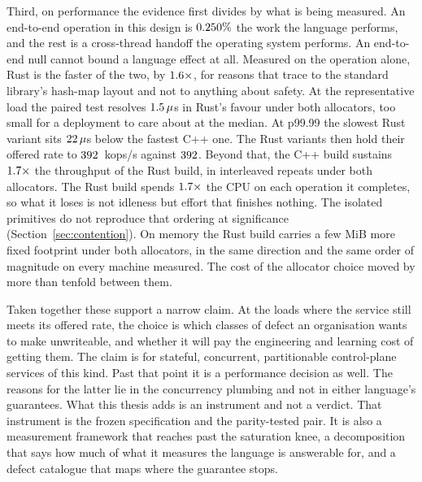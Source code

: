 \documentclass[english,oneside,a4paper,censored,csm,software-track-2020]{HYthesisML}
\begin{document}
Third, on performance the evidence first divides by what is being measured. An end-to-end
operation in this design is $0.250\%$ the work the language performs, and the
rest is a cross-thread handoff the operating system performs. An end-to-end null cannot bound a
language effect at all. Measured on the operation alone, Rust is the faster of the two, by
$1.6\times$, for reasons that trace to the standard library's hash-map layout and
not to anything about safety. At the representative load the paired test resolves
$1.5\,\mu$s in Rust's favour under both allocators, too small for a deployment to
care about at the median. At p99.99 the slowest Rust variant sits $22\,\mu$s below
the fastest C++ one. The Rust variants then hold their offered rate to $392$~kops/s
against $392$. Beyond that, the C++ build sustains $1.7\times$ the
throughput of the Rust build, in \OverloadThrAgree{} interleaved repeats under both allocators.
The Rust build spends $1.7\times$ the CPU on each operation it completes, so
what it loses is not idleness but effort that finishes nothing. The isolated primitives do not
reproduce that ordering at significance (Section~\ref{sec:contention}). On memory the Rust
build carries a few MiB more fixed footprint under both allocators, in the same direction and
the same order of magnitude on every machine measured. The cost of the allocator choice moved by
more than tenfold between them.

Taken together these support a narrow claim. At the loads where the service still meets its
offered rate, the choice is which classes of defect an organisation wants to make unwriteable,
and whether it will pay the engineering and learning cost of getting them. The claim is for
stateful, concurrent, partitionable control-plane services of this kind. Past that point it is a
performance decision as well. The reasons for the latter lie in the concurrency plumbing and not
in either language's guarantees. What this thesis adds is an instrument and not a verdict. That
instrument is the frozen specification and the parity-tested pair. It is also a measurement
framework that reaches past the saturation knee, a decomposition that says how much of what it
measures the language is answerable for, and a defect catalogue that maps where the guarantee
stops.
\end{document}
